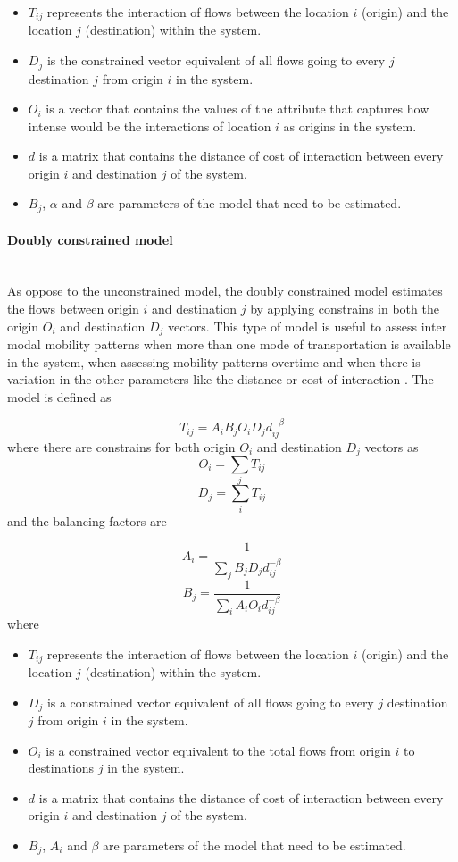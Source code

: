 \documentclass{article}
\begin{document}
\begin{itemize}
  \item $T_{ij}$ represents the interaction of flows between the location $i$ (origin) and the location $j$ (destination) within the system. 
  \item $D_{j}$ is the constrained vector equivalent of all flows going to every $j$ destination $j$ from origin $i$ in the system.
  \item $O_{i}$ is a vector that contains the values of the attribute that captures how intense would be the interactions of location $i$ as origins in the system.
    \item $d$ is a matrix that contains the distance of cost of interaction between every origin $i$ and destination $j$ of the system.
    \item $B_{j}$, $\alpha$  and $\beta$ are parameters of the model that need to be estimated.
\end{itemize}


\paragraph{Doubly constrained model}\mbox{}\\

As oppose to the unconstrained model, the doubly constrained model estimates the flows between origin $i$ and destination $j$ by applying constrains in both the origin $O_{i}$ and destination $D_{j}$ vectors. This type of model is useful to assess inter modal mobility patterns when more than one mode of transportation is available in the system, when assessing mobility patterns overtime and when there is variation in the other parameters like the distance or cost of interaction \citep{wilkinsonSpatialInteractionModelling2023}. The model is defined as

\[T_{ij} = A_i B_j O_i D_j d_{ij}^{-\beta}\] where there are constrains for both origin $O_{i}$ and destination $D_{j}$ vectors as \[O_i = \sum_j T_{ij}\] \[D_j = \sum_i T_{ij} \] and the balancing factors are

\[A_i = \frac{1}{\sum_j B_j D_j d_{ij}^{-\beta}}\]
\[B_j = \frac{1}{\sum_i A_i O_i d_{ij}^{-\beta}}\] where 

\begin{itemize}
  \item $T_{ij}$ represents the interaction of flows between the location $i$ (origin) and the location $j$ (destination) within the system. 
  \item $D_{j}$ is a constrained vector equivalent of all flows going to every $j$ destination $j$ from origin $i$ in the system.
  \item $O_{i}$ is a constrained vector equivalent to the total flows from origin $i$ to destinations $j$ in the system.
    \item $d$ is a matrix that contains the distance of cost of interaction between every origin $i$ and destination $j$ of the system.
    \item $B_{j}$, $A_{i}$ and $\beta$ are parameters of the model that need to be estimated.
\end{itemize}
\end{document}
